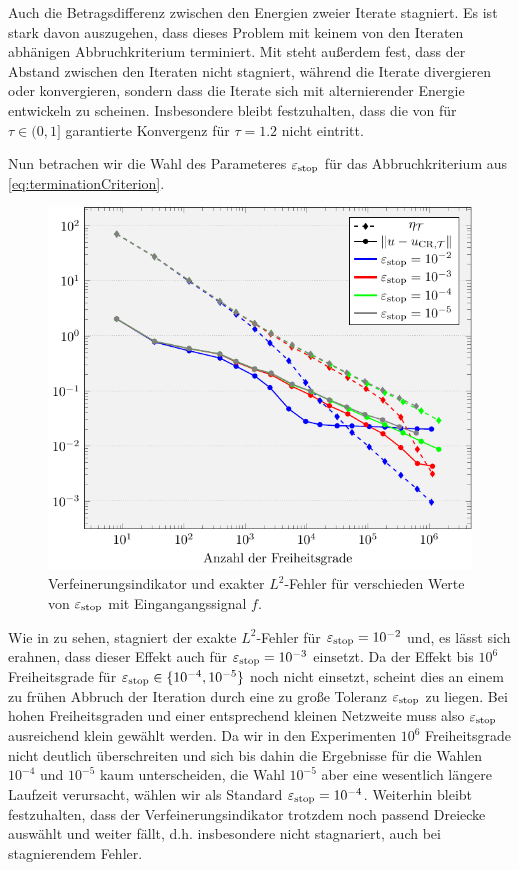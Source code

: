Auch die Betragsdifferenz zwischen den Energien zweier Iterate stagniert.
Es ist stark davon auszugehen, dass dieses Problem mit keinem von den
Iteraten abhänigen Abbruchkriterium terminiert.
Mit  steht außerdem fest, dass der
Abstand zwischen den Iteraten nicht stagniert, während die Iterate divergieren
oder konvergieren, sondern dass die Iterate sich mit alternierender Energie
entwickeln zu scheinen.
Insbesondere bleibt festzuhalten, dass die von 
für $\tau\in(0,1]$ garantierte Konvergenz für $\tau=1.2$ nicht eintritt.

Nun betrachen wir die Wahl des Parameteres $\varepsilon_{\textup{stop}}$ für das Abbruchkriterium
aus \eqref{eq:terminationCriterion}.
\begin{figure}[p]
  \centering
  \includegraphics[width=\linewidth]
    {pictures/chapExperiments/secParameters/parEpsStop/f01/convergenceF.pdf}
  \caption{Verfeinerungsindikator und exakter $L^2$-Fehler für verschieden
  Werte von $\varepsilon_{\textup{stop}}$ mit Eingangangssignal $f$.}
  \label{fig:parEpsStopConvergence}
\end{figure}
Wie in  zu sehen, stagniert der 
exakte $L^2$-Fehler für $\varepsilon_{\textup{stop}}=10^{-2}$ und, es lässt sich erahnen, dass
dieser Effekt auch für $\varepsilon_{\textup{stop}}=10^{-3}$ einsetzt. 
Da der Effekt bis $10^6$ Freiheitsgrade für $\varepsilon_{\textup{stop}}\in\{10^{-4},10^{-5}\}$
noch nicht einsetzt, scheint dies an einem zu frühen Abbruch der Iteration 
durch eine zu große Toleranz $\varepsilon_{\textup{stop}}$ zu liegen. 
Bei hohen Freiheitsgraden und einer entsprechend kleinen Netzweite muss
also $\varepsilon_{\textup{stop}}$ ausreichend klein gewählt werden.
Da wir in den Experimenten  $10^6$ Freiheitsgrade nicht deutlich überschreiten
und sich bis dahin die Ergebnisse für die Wahlen $10^{-4}$ und $10^{-5}$ kaum
unterscheiden, die Wahl $10^{-5}$ aber eine wesentlich längere Laufzeit
verursacht, wählen wir als Standard $\varepsilon_{\textup{stop}}=10^{-4}$.
Weiterhin bleibt festzuhalten, dass der Verfeinerungsindikator trotzdem noch
passend Dreiecke auswählt und weiter fällt, d.h. insbesondere nicht
stagnariert, auch bei stagnierendem Fehler.


